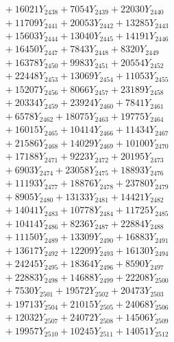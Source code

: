 \documentclass[a4paper,10pt]{article}
\begin{document}
{\begin{align}
&\;  + 16021 Y_{2438} + 7054 Y_{2439} + 22030 Y_{2440} \\[0.3ex]
&\;  + 11709 Y_{2441} + 20053 Y_{2442} + 13285 Y_{2443} \\[0.3ex]
&\;  + 15603 Y_{2444} + 13040 Y_{2445} + 14191 Y_{2446} \\[0.3ex]
&\;  + 16450 Y_{2447} + 7843 Y_{2448} + 8320 Y_{2449} \\[0.3ex]
&\;  + 16378 Y_{2450} + 9983 Y_{2451} + 20554 Y_{2452} \\[0.3ex]
&\;  + 22448 Y_{2453} + 13069 Y_{2454} + 11053 Y_{2455} \\[0.3ex]
&\;  + 15207 Y_{2456} + 8066 Y_{2457} + 23189 Y_{2458} \\[0.5ex]\allowbreak
&\;  + 20334 Y_{2459} + 23924 Y_{2460} + 7841 Y_{2461} \\[0.3ex]
&\;  + 6578 Y_{2462} + 18075 Y_{2463} + 19775 Y_{2464} \\[0.3ex]
&\;  + 16015 Y_{2465} + 10414 Y_{2466} + 11434 Y_{2467} \\[0.3ex]
&\;  + 21586 Y_{2468} + 14029 Y_{2469} + 10100 Y_{2470} \\[0.3ex]
&\;  + 17188 Y_{2471} + 9223 Y_{2472} + 20195 Y_{2473} \\[0.3ex]
&\;  + 6903 Y_{2474} + 23058 Y_{2475} + 18893 Y_{2476} \\[0.3ex]
&\;  + 11193 Y_{2477} + 18876 Y_{2478} + 23780 Y_{2479} \\[0.3ex]
&\;  + 8905 Y_{2480} + 13133 Y_{2481} + 14421 Y_{2482} \\[0.3ex]
&\;  + 14041 Y_{2483} + 10778 Y_{2484} + 11725 Y_{2485} \\[0.3ex]
&\;  + 10414 Y_{2486} + 8236 Y_{2487} + 22884 Y_{2488} \\[0.5ex]\allowbreak
&\;  + 11150 Y_{2489} + 13309 Y_{2490} + 16883 Y_{2491} \\[0.3ex]
&\;  + 13617 Y_{2492} + 12209 Y_{2493} + 16130 Y_{2494} \\[0.3ex]
&\;  + 24245 Y_{2495} + 18364 Y_{2496} + 8590 Y_{2497} \\[0.3ex]
&\;  + 22883 Y_{2498} + 14688 Y_{2499} + 22208 Y_{2500} \\[0.3ex]
&\;  + 7530 Y_{2501} + 19572 Y_{2502} + 20473 Y_{2503} \\[0.3ex]
&\;  + 19713 Y_{2504} + 21015 Y_{2505} + 24068 Y_{2506} \\[0.3ex]
&\;  + 12032 Y_{2507} + 24072 Y_{2508} + 14506 Y_{2509} \\[0.3ex]
&\;  + 19957 Y_{2510} + 10245 Y_{2511} + 14051 Y_{2512} \\[0.3ex]

\end{align}}
\end{document}
